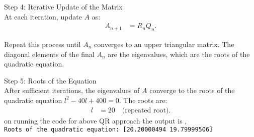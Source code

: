 \documentclass[article]{IEEEtran}
\numberwithin{figure}{enumi}
\begin{document}
\begin{itemize}
Step 4: Iterative Update of the Matrix\\
At each iteration, update $A$ as:
\begin{align}
A_{n+1} &= R_n Q_n.
\end{align}

Repeat this process until $A_n$ converges to an upper triangular matrix. The diagonal elements of the final $A_n$ are the eigenvalues, which are the roots of the quadratic equation.

Step 5: Roots of the Equation\\
After sufficient iterations, the eigenvalues of $A$ converge to the roots of the quadratic equation $l^2 - 40l + 400 = 0$. The roots are:
\begin{align}
l &= 20 \quad \text{(repeated root)}.
\end{align}
on running the code for above QR approach the output is ,\\
\texttt{Roots of the quadratic equation: [20.20000494 19.79999506]}
\end{itemize}
\end{document}
